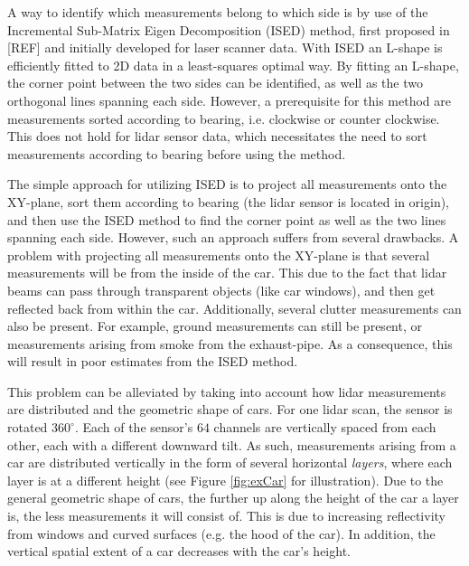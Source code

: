A way to identify which measurements belong to which side is by use of the Incremental Sub-Matrix Eigen Decomposition (ISED) method, first proposed in [REF] and initially developed for laser scanner data. With ISED an L-shape is efficiently fitted to 2D data in a least-squares optimal way. By fitting an L-shape, the corner point between the two sides can be identified, as well as the two orthogonal lines spanning each side. However, a prerequisite for this method are measurements sorted according to bearing, i.e. clockwise or counter clockwise. This does not hold for lidar sensor data, which necessitates the need to sort measurements according to bearing before using the method.

The simple approach for utilizing ISED is to project all measurements onto the XY-plane, sort them according to bearing (the lidar sensor is located in origin), and then use the ISED method to find the corner point as well as the two lines spanning each side. However, such an approach suffers from several drawbacks. A problem with projecting all measurements onto the XY-plane is that several measurements will be from the inside of the car. This due to the fact that lidar beams can pass through transparent objects (like car windows), and then get reflected back from within the car. Additionally, several clutter measurements can also be present. For example, ground measurements can still be present, or measurements arising from smoke from the exhaust-pipe. As a consequence, this will result in poor estimates from the ISED method. 

This problem can be alleviated by taking into account how lidar measurements are distributed and the geometric shape of cars. For one lidar scan, the sensor is rotated $360^\circ$. Each of the sensor's $64$ channels are vertically spaced from each other, each with a different downward tilt. As such, measurements arising from a car are distributed vertically in the form of several horizontal \emph{layers}, where each layer is at a different height (see Figure \ref{fig:exCar} for illustration). Due to the general geometric shape of cars, the further up along the height of the car a layer is, the less measurements it will consist of. This is due to increasing reflectivity from windows and curved surfaces (e.g. the hood of the car). In addition, the vertical spatial extent of a car decreases with the car's height. 

